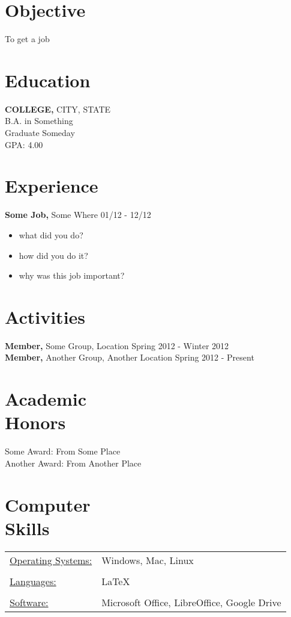 \documentclass[margin]{resume}
\begin{document}
 

\address{EMAIL ADDRESS \\ PHONE \#}
\address{HOME ADDRESS \\ CITY, STATE ZIP}

\begin{resume}


\section{Objective}
  To get a job


\section{Education}
{\bf COLLEGE,} CITY, STATE \\
  B.A. in Something \\
  Graduate Someday\\
  GPA: 4.00


\section{Experience}

{\bf Some Job,} Some Where \hfill 01/12 - 12/12
\begin{itemize} \itemsep -2pt
  \item what did you do?
  \item how did you do it?
  \item why was this job important?
\end{itemize}


\section{Activities}
{\bf Member,} Some Group, Location \hfill Spring 2012 - Winter 2012 \\
{\bf Member,} Another Group, Another Location \hfill Spring 2012 - Present


\section{Academic \\ Honors}
Some Award: From Some Place \\
Another Award: From Another Place


\section{Computer \\ Skills}
\begin{tabular}{l p{3in}}
  \underline{Operating Systems:} & Windows, Mac, Linux \\ \\
  \underline{Languages:} & \LaTeX \\ \\
  \underline{Software:} & Microsoft Office, LibreOffice, Google Drive \\
\end{tabular}


\end{resume}
\end{document}
